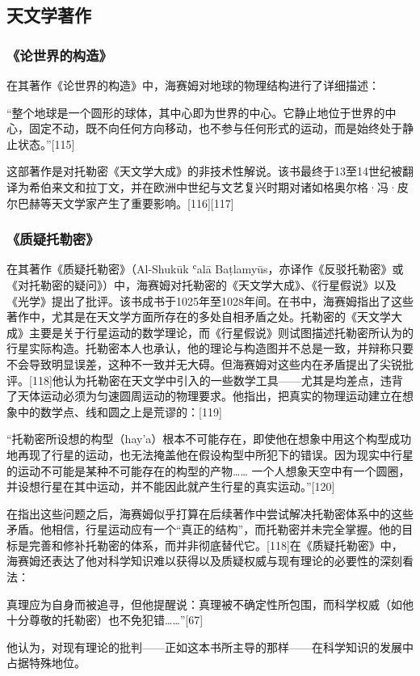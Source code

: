 \subsection{天文学著作}
\subsubsection{《论世界的构造》}
在其著作《论世界的构造》中，海赛姆对地球的物理结构进行了详细描述：

“整个地球是一个圆形的球体，其中心即为世界的中心。它静止地位于世界的中心，固定不动，既不向任何方向移动，也不参与任何形式的运动，而是始终处于静止状态。”[115]

这部著作是对托勒密《天文学大成》的非技术性解说。该书最终于13至14世纪被翻译为希伯来文和拉丁文，并在欧洲中世纪与文艺复兴时期对诸如格奥尔格·冯·皮尔巴赫等天文学家产生了重要影响。[116][117]
\subsubsection{《质疑托勒密》}
在其著作《质疑托勒密》（Al-Shukūk ʿalā Baṭlamyūs，亦译作《反驳托勒密》或《对托勒密的疑问》）中，海赛姆对托勒密的《天文学大成》、《行星假说》以及《光学》提出了批评。该书成书于1025年至1028年间。在书中，海赛姆指出了这些著作中，尤其是在天文学方面所存在的多处自相矛盾之处。托勒密的《天文学大成》主要是关于行星运动的数学理论，而《行星假说》则试图描述托勒密所认为的行星实际构造。托勒密本人也承认，他的理论与构造图并不总是一致，并辩称只要不会导致明显误差，这种不一致并无大碍。但海赛姆对这些内在矛盾提出了尖锐批评。[118]他认为托勒密在天文学中引入的一些数学工具——尤其是均差点，违背了天体运动必须为匀速圆周运动的物理要求。他指出，把真实的物理运动建立在想象中的数学点、线和圆之上是荒谬的：[119]

“托勒密所设想的构型（hay’a）根本不可能存在，即使他在想象中用这个构型成功地再现了行星的运动，也无法掩盖他在假设构型中所犯下的错误。因为现实中行星的运动不可能是某种不可能存在的构型的产物……
一个人想象天空中有一个圆圈，并设想行星在其中运动，并不能因此就产生行星的真实运动。”[120]

在指出这些问题之后，海赛姆似乎打算在后续著作中尝试解决托勒密体系中的这些矛盾。他相信，行星运动应有一个“真正的结构”，而托勒密并未完全掌握。他的目标是完善和修补托勒密的体系，而并非彻底替代它。[118]在《质疑托勒密》中，海赛姆还表达了他对科学知识难以获得以及质疑权威与现有理论的必要性的深刻看法：

真理应为自身而被追寻，但他提醒说：真理被不确定性所包围，而科学权威（如他十分尊敬的托勒密）也不免犯错……”[67]

他认为，对现有理论的批判——正如这本书所主导的那样——在科学知识的发展中占据特殊地位。
